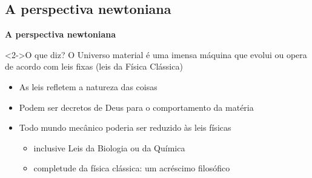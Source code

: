 \subsection{A perspectiva newtoniana}
\begin{frame}{\textbf{A perspectiva newtoniana}}

	 \centering
	 \begin{minipage}{\textwidth}
	  \begin{exampleblock}<2->{O que diz?}
		  O Universo material é uma imensa máquina que evolui ou opera de acordo com
			 \textcolor{NordYellow}{leis fixas} (leis da Física Clássica)
		 \end{exampleblock}
	 \end{minipage}
	
	\vspace{0.5cm}
	\begin{itemize}
		\item<3->[$\bullet$] As leis refletem a natureza das coisas
		\item<4->[$\bullet$] Podem ser decretos de Deus para o comportamento da matéria
		\item<5->[$\bullet$] Todo mundo mecânico poderia ser reduzido às leis físicas
		 \begin{itemize}
				\item<6-> inclusive Leis da Biologia ou da Química
				\item<7-> \textcolor{NordRed}{completude da física clássica}: um acréscimo
					filosófico
			\end{itemize}
	\end{itemize}
\end{frame}

